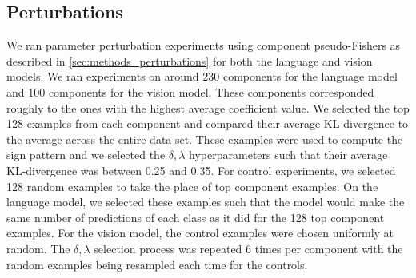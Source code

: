 \documentclass[dvipsnames]{article}
\begin{document}





\subsection{Perturbations}
We ran parameter perturbation experiments using component pseudo-Fishers as described in \cref{sec:methods_perturbations} for both the language and vision models.
We ran experiments on around 230 components for the language model and 100 components for the vision model.
These components corresponded roughly to the ones with the highest average coefficient value.
We selected the top 128 examples from each component and compared their average KL-divergence to the average across the entire data set.
These examples were used to compute the sign pattern and we selected the $\delta,\lambda$ hyperparameters such that their average KL-divergence was between 0.25 and 0.35.
% 
For control experiments, we selected 128 random examples to take the place of top component examples.
On the language model, we selected these examples such that the model would make the same number of predictions of each class as it did for the 128 top component examples.
For the vision model, the control examples were chosen uniformly at random.
The $\delta,\lambda$ selection process was repeated 6 times per component with the random examples being resampled each time for the controls.
\end{document}
